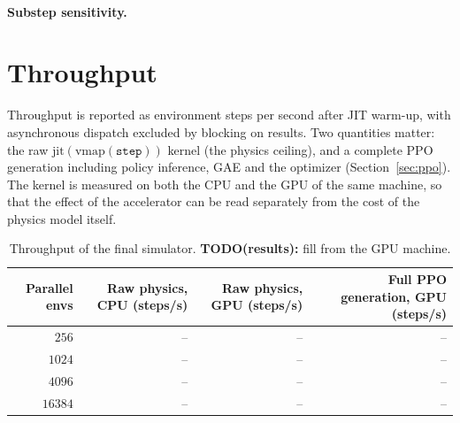 \paragraph{Substep sensitivity.}

\section{Throughput}
\label{sec:sim_throughput}

Throughput is reported as environment steps per second after JIT warm-up, with asynchronous dispatch
excluded by blocking on results.  Two quantities matter: the raw $\mathrm{jit}(\mathrm{vmap}(\texttt{step}))$
kernel (the physics ceiling), and a complete PPO generation including policy inference, GAE and the optimizer
(Section~\ref{sec:ppo}).  The kernel is measured on both the CPU and the GPU of the same machine, so that the effect of the accelerator can be read separately
from the cost of the physics model itself.

\begin{table}[ht]
    \centering
    \caption{Throughput of the final simulator. \textbf{TODO(results):} fill from the GPU machine.}
    \label{tab:sim_throughput}
    \small
    \begin{tabular}{rrrr}
        \toprule
        \textbf{Parallel envs} & \textbf{Raw physics, CPU (steps/s)} & \textbf{Raw physics, GPU (steps/s)} & \textbf{Full PPO generation, GPU (steps/s)} \\
        \midrule
        $256$   & -- & -- & -- \\
        $1024$  & -- & -- & -- \\
        $4096$  & -- & -- & -- \\
        $16384$ & -- & -- & -- \\
        \bottomrule
    \end{tabular}
\end{table}

